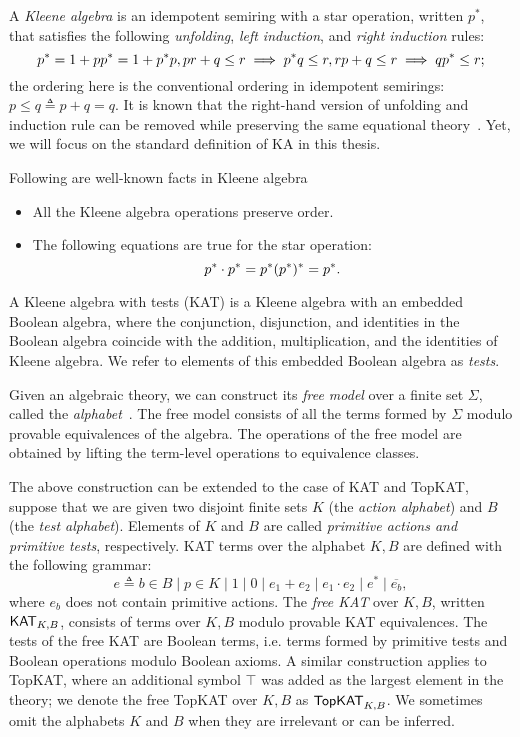 A \emph{Kleene algebra} is an idempotent semiring with a star operation, written
$p^*$, that satisfies the following \emph{unfolding}, \emph{left induction},
and \emph{right induction} rules:
\[
    p^* = 1 + p p^* = 1 + p^* p, \\
    p r + q  \leq  r  \implies  p^* q  \leq  r, \\
    r p + q  \leq  r  \implies  q p^*  \leq  r;
\]
the ordering here is the conventional ordering in idempotent semirings: \(p  \leq  q  \triangleq  p + q = q.\)
It is known that the right-hand version of unfolding and induction rule 
can be removed while preserving the same equational theory~\cite{Kozen_Silva_2020}.
Yet, we will focus on the standard definition of KA in this thesis.
\begin{lemma}\label{the: well known fact about KA}
    Following are well-known facts in Kleene algebra
    \begin{itemize}
        \item All the Kleene algebra operations preserve order.
        \item The following equations are true for the star operation:
              \[ p^*  \cdot  p^* = p^* \\ (p^*)^* = p^*.\]
    \end{itemize}
\end{lemma}

A Kleene algebra with tests (KAT) is a Kleene algebra with an embedded Boolean algebra,
where the conjunction, disjunction, and identities in the Boolean algebra coincide with 
the addition, multiplication, and the identities of Kleene algebra.  
We refer to elements of this embedded Boolean algebra as \emph{tests}.

Given an algebraic theory, we can construct its \emph{free model} 
over a finite set \( Σ \), 
called the \emph{alphabet}~\cite{burrisCourseUniversalAlgebra1981}.  
The free model consists of all the terms formed by \( Σ \) modulo  
provable equivalences of the algebra. The operations of the free model are obtained 
by lifting the term-level operations to equivalence classes.

The above construction can be extended to the case of KAT and TopKAT, 
suppose that we are given two disjoint finite sets $K$ (the
\emph{action alphabet}) and $B$ (the \emph{test alphabet}).  Elements of $K$ and
$B$ are called \emph{primitive actions and primitive tests}, respectively. 
KAT terms over the alphabet \(K, B\) are defined with the following grammar:
\[e  ≜  b  ∈  B  ∣  p  ∈  K  ∣  1  ∣  0  ∣  e_1 + e_2  ∣  e_1  ⋅  e_2  ∣  e^*  ∣  \overline{e_b},\]
where \(e_b\) does not contain primitive actions.
The \emph{free KAT} over \(K, B\), written $\mathsf{KAT}_{K,B}$, 
consists of terms over \(K, B\) modulo provable KAT equivalences.  
The tests of the free KAT are Boolean terms, i.e. terms formed by
primitive tests and Boolean operations modulo Boolean axioms.  A similar
construction applies to TopKAT, where an additional symbol \( ⊤ \) was added 
as the largest element in the theory; we denote the free TopKAT over $K,B$ as
\(\mathsf{TopKAT}_{K, B}\).  We sometimes omit the alphabets \(K\) and \(B\) when they
are irrelevant or can be inferred.

